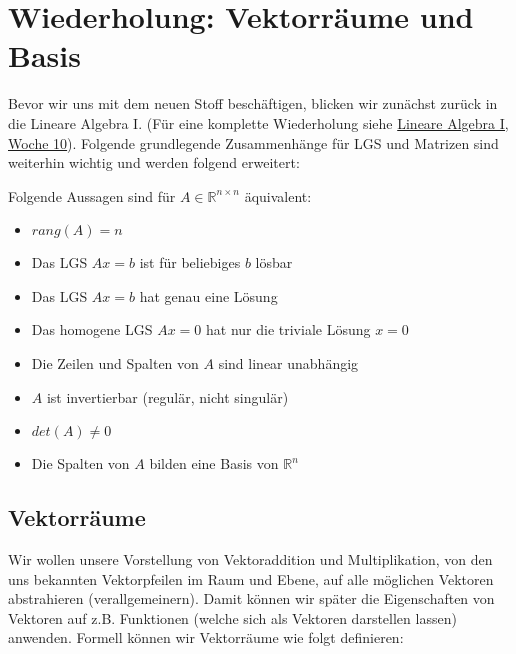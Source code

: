 \setcounter{section}{-1}
\section{Wiederholung: Vektorräume und Basis}

Bevor wir uns mit dem neuen Stoff beschäftigen, blicken wir zunächst zurück in die Lineare Algebra I. (Für eine komplette Wiederholung siehe \href{https://n.ethz.ch/~nbartzsch/notizen/notizen_lin_alg_I/Uebung_10_Repetition.pdf}{Lineare Algebra I, Woche 10}). Folgende grundlegende Zusammenhänge für LGS und Matrizen sind weiterhin wichtig und werden folgend erweitert:

\begin{tcolorbox}[colback=gray!30, colframe=gray!80, title=Wichtige Zusammenhänge]
    Folgende Aussagen sind für \( A \in \mathbb{R}^{n \times n} \) äquivalent:
    \begin{itemize}
        \item \(rang (A) = n \)
        \item Das LGS \( Ax=b \) ist für beliebiges \( b \) lösbar
        \item Das LGS \( Ax=b \) hat genau eine Lösung
        \item Das homogene LGS \( Ax=0 \) hat nur die triviale Lösung \( x = 0 \)
        \item Die Zeilen und Spalten von \( A \) sind linear unabhängig
        \item \( A \) ist invertierbar (regulär, nicht singulär)
        \item \( det(A) \neq 0 \)
        \item Die Spalten von \( A \) bilden eine Basis von \( \mathbb{R}^n \)   
    \end{itemize}
\end{tcolorbox}

\subsection{Vektorräume}

Wir wollen unsere Vorstellung von Vektoraddition und Multiplikation, von den uns bekannten Vektorpfeilen im Raum und Ebene, auf alle möglichen Vektoren abstrahieren (verallgemeinern). Damit können wir später die Eigenschaften von Vektoren auf z.B. Funktionen (welche sich als Vektoren darstellen lassen) anwenden. Formell können wir Vektorräume wie folgt definieren:

